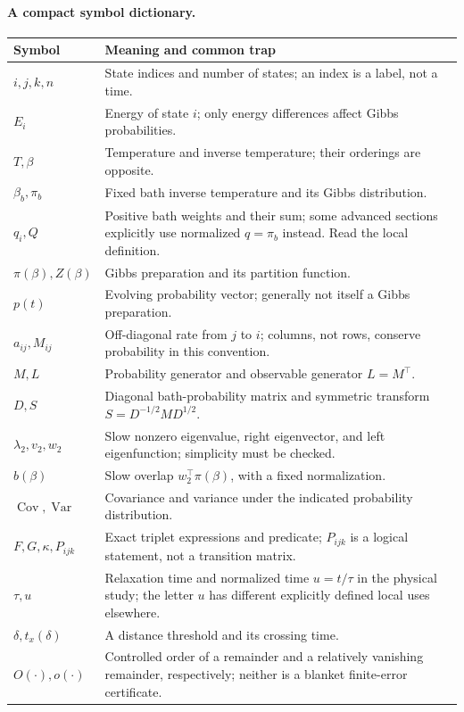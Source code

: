 \documentclass[11pt]{article}
\newcommand{\Cov}{\operatorname{Cov}}
\newcommand{\Var}{\operatorname{Var}}
\begin{document}
\paragraph{A compact symbol dictionary.}
\begin{longtable}{>{\raggedright\arraybackslash}p{}>{\raggedright\arraybackslash}p{}}
\toprule Symbol & Meaning and common trap\\\midrule
\endhead
$i,j,k,n$ & State indices and number of states; an index is a label, not a time.\\
$E_i$ & Energy of state $i$; only energy differences affect Gibbs probabilities.\\
$T,\beta$ & Temperature and inverse temperature; their orderings are opposite.\\
$\beta_b,\pi_b$ & Fixed bath inverse temperature and its Gibbs distribution.\\
$q_i,Q$ & Positive bath weights and their sum; some advanced sections explicitly
use normalized $q=\pi_b$ instead. Read the local definition.\\
$\pi(\beta),Z(\beta)$ & Gibbs preparation and its partition function.\\
$p(t)$ & Evolving probability vector; generally not itself a Gibbs preparation.\\
$a_{ij},M_{ij}$ & Off-diagonal rate from $j$ to $i$; columns, not rows,
conserve probability in this convention.\\
$M,L$ & Probability generator and observable generator $L=M^\top$.\\
$D,S$ & Diagonal bath-probability matrix and symmetric transform
$S=D^{-1/2}MD^{1/2}$.\\
$\lambda_2,v_2,w_2$ & Slow nonzero eigenvalue, right eigenvector, and left
eigenfunction; simplicity must be checked.\\
$b(\beta)$ & Slow overlap $w_2^\top\pi(\beta)$, with a fixed normalization.\\
$\Cov,\Var$ & Covariance and variance under the indicated probability distribution.\\
$F,G,\kappa,P_{ijk}$ & Exact triplet expressions and predicate; $P_{ijk}$
is a logical statement, not a transition matrix.\\
$\tau,u$ & Relaxation time and normalized time $u=t/\tau$ in the physical study;
the letter $u$ has different explicitly defined local uses elsewhere.\\
$\delta,t_x(\delta)$ & A distance threshold and its crossing time.\\
$O(\cdot),o(\cdot)$ & Controlled order of a remainder and a relatively vanishing
remainder, respectively; neither is a blanket finite-error certificate.\\
\bottomrule
\end{longtable}
\end{document}
